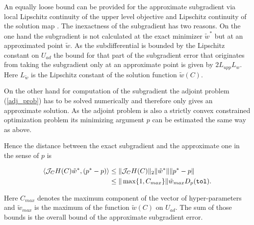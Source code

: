 An equally loose bound can be provided for the approximate subgradient via local Lipschitz continuity of the upper level objective and Lipschitz continuity of the solution map \cite[chapter 5]{Outrata1998}.
The inexactness of the subgradient has two reasons. On the one hand the subgradient is not calculated at the exact minimizer \(\tilde{w}^*\) but at an approximated point \(\tilde{w}\).
As the subdifferential is bounded by the Lipschitz constant on \(U_{ad}\) the bound for that part of the subgradient error that originates from taking the subgradient only at an approximate point is given by \(2L_{upp}L_{w}\). Here \(L_{\tilde{w}}\) is the Lipschitz constant of the solution function \(\tilde{w}(C)\).




On the other hand for computation of the subgradient the adjoint problem (\ref{adj_prob}) has to be solved numerically and therefore only gives an approximate solution.
As the adjoint problem is also a strictly convex constrained optimization problem its minimizing argument \(p\) can be estimated the same way as above.

Hence the distance between the exact subgradient and the approximate one in the sense of \(p\) is

\begin{align*}
	\left\langle \mathcal{J}_CH(C)\tilde{w}^*, (p^*-p) \right\rangle &\leq \Vert \mathcal{J}_CH(C) \Vert_2 \Vert\tilde{w}^* \Vert \Vert p^*-p \Vert \\
	& \leq \Vert \max\{1,C_{max}\} \Vert \tilde{w}_{max}  D_{p}(\mathtt{tol}).
\end{align*}

Here \(C_{max}\) denotes the maximum component of the vector of hyper-parameters and \(\tilde{w}_{max}\) is the maximum of the function \(\tilde{w}(C)\) on \(U_{ad}\).
The sum of those bounds is the overall bound of the approximate subgradient error.



